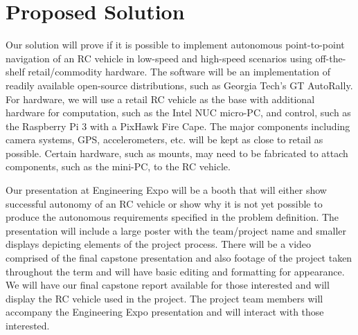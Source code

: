 \documentclass[draftclsnofoot,onecolumn,10pt]{IEEEtran}
\begin{document}
\section{Proposed Solution}
Our solution will prove if it is possible to implement autonomous point-to-point navigation of an RC vehicle in low-speed and high-speed scenarios using off-the-shelf retail/commodity hardware.  
The software will be an implementation of readily available open-source distributions, such as Georgia Tech's GT AutoRally. 
For hardware, we will use a retail RC vehicle as the base with additional hardware for computation, such as the Intel NUC micro-PC, and control, such as the Raspberry Pi 3 with a PixHawk Fire Cape. 
The major components including camera systems, GPS, accelerometers, etc. will be kept as close to retail as possible. 
Certain hardware, such as mounts, may need to be fabricated to attach components, such as the mini-PC, to the RC vehicle.\par
Our presentation at Engineering Expo will be a booth that will either show successful autonomy of an RC vehicle or show why it is not yet possible to produce the autonomous requirements specified in the problem definition. 
The presentation will include a large poster with the team/project name and smaller displays depicting elements of the project process. 
There will be a video comprised of the final capstone presentation and also footage of the project taken throughout the term and will have basic editing and formatting for appearance. 
We will have our final capstone report available for those interested and will display the RC vehicle used in the project. 
The project team members will accompany the Engineering Expo presentation and will interact with those interested.
\end{document}
